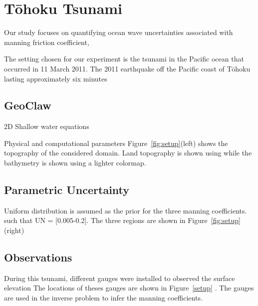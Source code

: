 \section{T\={o}hoku Tsunami}
Our study focuses on quantifying ocean wave uncertainties associated with 
manning friction coefficient, 

The setting chosen for our experiment is the tsunami in the Pacific ocean 
that occurred in 11 March 2011. The 2011 earthquake off the Pacific coast of Tōhoku lasting approximately six minutes


\subsection{GeoClaw}
2D Shallow water equations


Physical and computational parameters
Figure~\ref{fig:setup}(left) shows the topography of the considered domain.
Land topography is shown using while the bathymetry is shown using a lighter colormap.



\subsection{Parametric Uncertainty}
Uniform distribution is assumed as the prior for the three manning coefficients.
such that UN = [0.005-0.2]. The three regions are shown in Figure~\ref{fig:setup}(right)

\subsection{Observations}
During this tsunami, different gauges were installed to observed the surface elevation
The locations of theses gauges are shown in Figure~\ref{setup} .
The gauges are used in the inverse problem to infer the manning coefficients.

